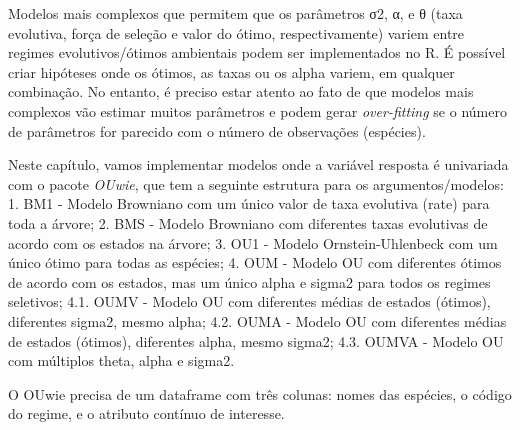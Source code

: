 \documentclass[
]{book}
\newenvironment{Shaded}{\begin{snugshade}}{\end{snugshade}}
\newcommand{\AttributeTok}[1]{\textcolor[rgb]{0.13,0.29,0.53}{#1}}
\newcommand{\CommentTok}[1]{\textcolor[rgb]{0.56,0.35,0.01}{\textit{#1}}}
\newcommand{\DecValTok}[1]{\textcolor[rgb]{0.00,0.00,0.81}{#1}}
\newcommand{\FunctionTok}[1]{\textcolor[rgb]{0.13,0.29,0.53}{\textbf{#1}}}
\newcommand{\NormalTok}[1]{#1}
\newcommand{\OtherTok}[1]{\textcolor[rgb]{0.56,0.35,0.01}{#1}}
\newcommand{\SpecialCharTok}[1]{\textcolor[rgb]{0.81,0.36,0.00}{\textbf{#1}}}
\newcommand{\StringTok}[1]{\textcolor[rgb]{0.31,0.60,0.02}{#1}}
\begin{document}
Modelos mais complexos que permitem que os parâmetros σ2, α, e θ (taxa evolutiva, força de seleção e valor do ótimo, respectivamente) variem entre regimes evolutivos/ótimos ambientais podem ser implementados no R. É possível criar hipóteses onde os ótimos, as taxas ou os alpha variem, em qualquer combinação. No entanto, é preciso estar atento ao fato de que modelos mais complexos vão estimar muitos parâmetros e podem gerar \emph{over-fitting} se o número de parâmetros for parecido com o
número de observações (espécies).

Neste capítulo, vamos implementar modelos onde a variável resposta é univariada com o pacote \emph{OUwie}, que tem a seguinte estrutura para os argumentos/modelos:
1. BM1 - Modelo Browniano com um único valor de taxa evolutiva (rate) para toda a árvore;
2. BMS - Modelo Browniano com diferentes taxas evolutivas de acordo com os estados na árvore;
3. OU1 - Modelo Ornstein-Uhlenbeck com um único ótimo para todas as espécies;
4. OUM - Modelo OU com diferentes ótimos de acordo com os estados, mas um único alpha e sigma2 para todos os regimes seletivos;
4.1. OUMV - Modelo OU com diferentes médias de estados (ótimos), diferentes sigma2, mesmo alpha;
4.2. OUMA - Modelo OU com diferentes médias de estados (ótimos), diferentes alpha, mesmo sigma2;
4.3. OUMVA - Modelo OU com múltiplos theta, alpha e sigma2.

O OUwie precisa de um dataframe com três colunas: nomes das espécies, o código do regime, e o atributo contínuo de interesse.

\begin{Shaded}
\end{Shaded}
\end{document}

